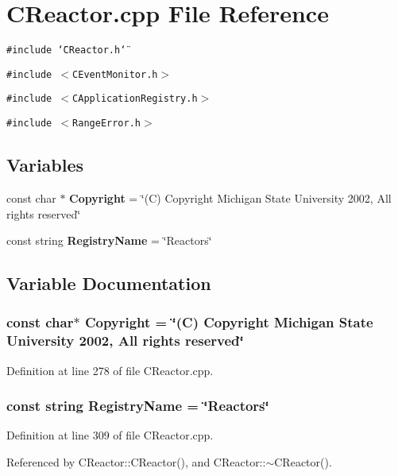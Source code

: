 \section{CReactor.cpp File Reference}
\label{CReactor_8cpp}
{\tt \#include \char`\"{}CReactor.h\char`\"{}}\par
{\tt \#include $<$CEvent\-Monitor.h$>$}\par
{\tt \#include $<$CApplication\-Registry.h$>$}\par
{\tt \#include $<$Range\-Error.h$>$}\par
\subsection*{Variables}
\begin{CompactItemize}
\item 
const char $\ast$ {\bf Copyright} = \char`\"{}(C) Copyright Michigan State University 2002, All rights reserved\char`\"{}
\item 
const string {\bf Registry\-Name} = \char`\"{}Reactors\char`\"{}
\end{CompactItemize}


\subsection{Variable Documentation}
\subsubsection{\setlength{\rightskip}{0pt plus 5cm}const char$\ast$ Copyright = \char`\"{}(C) Copyright Michigan State University 2002, All rights reserved\char`\"{}\hspace{0.3cm}{\tt  [static]}}\label{CReactor_8cpp_a0}




Definition at line 278 of file CReactor.cpp.
\subsubsection{\setlength{\rightskip}{0pt plus 5cm}const string Registry\-Name = \char`\"{}Reactors\char`\"{}\hspace{0.3cm}{\tt  [static]}}\label{CReactor_8cpp_a1}




Definition at line 309 of file CReactor.cpp.

Referenced by CReactor::CReactor(), and CReactor::$\sim$CReactor().